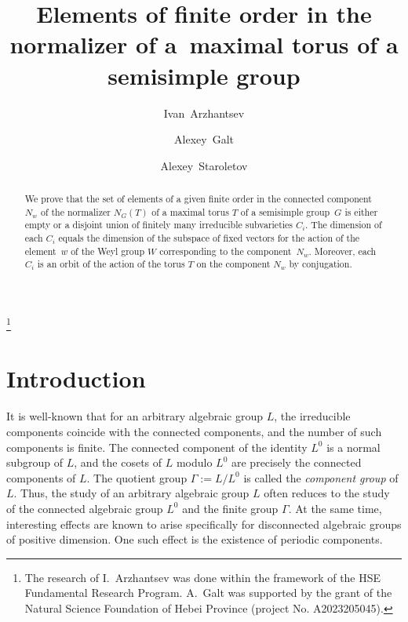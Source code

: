 \documentclass[a4paper,12pt]{amsart}
\theoremstyle{plain}
\theoremstyle{definition}
\begin{document}
\title[Elements of finite order in the normalizer of a maximal torus]{Elements of finite order in the normalizer of a~maximal torus of a semisimple group}
%
\author{Ivan~Arzhantsev}
\address{Faculty of Computer Science, HSE University, Pokrovsky Bulvar 11, Moscow, 109028 Russia}
%
\author{Alexey~Galt}
\address{School of Mathematical Science, Hebei Key Laboratory of Computational Mathematics and Applications, Hebei Normal University, Shijiazhuang 050024, P. R. China
and Sobolev Institute of Mathematics, Koptyuga 4, Novosibirsk,  630090 Russia}
%
\author{Alexey~Staroletov}
\address{Sobolev Institute of Mathematics, Koptyuga 4, Novosibirsk,  630090 Russia}
%
\thanks{The research of I.~Arzhantsev was done within the framework of the HSE Fundamental Research Program. 
A.~Galt was supported by the grant of the Natural Science Foundation of Hebei Province (project No. A2023205045). }
%
%
%
\begin{abstract}
We prove that the set of elements of a given finite order in the connected component $N_w$ of the normalizer $N_G(T)$ of a maximal torus $T$ of a semisimple group~$G$ is either empty or a disjoint union of finitely many irreducible subvarieties $C_i$. The dimension of each $C_i$ equals the dimension of the subspace of fixed vectors for the action of the element~$w$ of the Weyl group $W$ corresponding to the component~$N_w$. Moreover, each $C_i$ is an orbit of the action of the torus $T$ on the component $N_w$ by conjugation.
\end{abstract} 

\maketitle

\section{Introduction}

It is well-known that for an arbitrary algebraic group $L$, the irreducible components coincide with the connected components, and the number of such components is finite. The connected component of the identity $L^0$ is a normal subgroup of $L$, and the cosets of $L$ modulo $L^0$ are precisely the connected components of  $L$. The quotient group $\Gamma:=L/L^0$ is called the \emph{component group} of $L$. Thus, the study of an arbitrary algebraic group $L$ often reduces to the study of the connected algebraic group $L^0$ and the finite group $\Gamma$. At the same time, interesting effects are known to arise specifically for disconnected algebraic groups of positive dimension. One such effect is the existence of periodic components.
\end{document}
